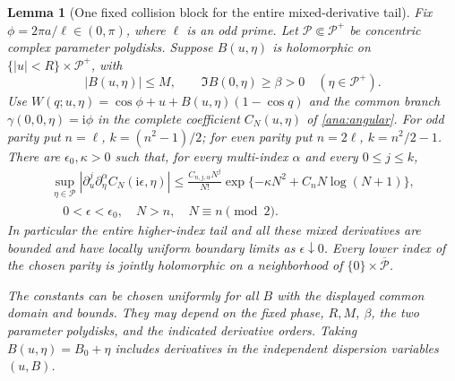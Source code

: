 \documentclass[11pt]{article}
\numberwithin{equation}{section}
\newtheorem{lemma}[theorem]{Lemma}
\theoremstyle{definition}
\begin{document}
\begin{lemma}[One fixed collision block for the entire mixed-derivative tail]
\label{ana:positivetail}
Fix $\phi=2\pi a/\ell\in(0,\pi)$, where $\ell$ is an odd
prime.  Let $\mathcal P\Subset\mathcal P^+$ be concentric complex
parameter polydisks.  Suppose $B(u,\eta)$ is holomorphic on
$\{|u|<R\}\times\mathcal P^+$, with
\[
 |B(u,\eta)|\le M,\qquad
 \Im B(0,\eta)\ge\beta>0
 \quad(\eta\in\mathcal P^+).
\]
Use $W(q;u,\eta)=\cos\phi+u+B(u,\eta)(1-\cos q)$ and the
common branch $\gamma(0,0,\eta)=\mathrm i\phi$ in the complete
coefficient $C_N(u,\eta)$ of \eqref{ana:angular}.  For odd parity
put $n=\ell$, $k=(n^2-1)/2$; for even parity put $n=2\ell$,
$k=n^2/2-1$.  There are $\epsilon_0,\kappa>0$ such that, for
every multi-index $\alpha$ and every $0\le j\le k$,
\begin{equation}\label{ana:block-mixed-tail}
 \begin{gathered}
 \sup_{\eta\in\mathcal P}
 |\partial_u^j\partial_\eta^\alpha C_N(\mathrm i\epsilon,\eta)|
 \le \frac{C_{n,j,\alpha}N^j}{N!}
       \exp\{-\kappa N^2+C_nN\log(N+1)\},\\
 \quad 0<\epsilon<\epsilon_0,
 \quad N>n,\quad N\equiv n\pmod2.
 \end{gathered}
\end{equation}
In particular the entire higher-index tail and all these mixed
derivatives are bounded and have locally uniform boundary limits as
$\epsilon\downarrow0$.  Every lower index of the chosen parity is
jointly holomorphic on a neighborhood of
$\{0\}\times\overline{\mathcal P}$.

The constants can be chosen uniformly for all $B$ with the displayed
common domain and bounds.  They may depend on the fixed phase, $R,M$,
$\beta$, the two parameter polydisks, and the indicated derivative
orders.  Taking $B(u,\eta)=B_0+\eta$ includes derivatives in the
independent dispersion variables $(u,B)$.
\end{lemma}
\end{document}
